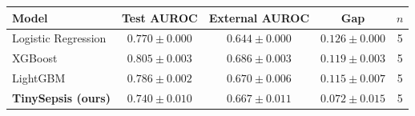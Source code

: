 \begin{tabular}{lcccc}
\toprule
Model & Test AUROC & External AUROC & Gap & $n$ \\
\midrule
Logistic Regression & $0.770 \pm 0.000$ & $0.644 \pm 0.000$ & $0.126 \pm 0.000$ & 5 \\
XGBoost & $0.805 \pm 0.003$ & $0.686 \pm 0.003$ & $0.119 \pm 0.003$ & 5 \\
LightGBM & $0.786 \pm 0.002$ & $0.670 \pm 0.006$ & $0.115 \pm 0.007$ & 5 \\
\textbf{TinySepsis (ours)} & $0.740 \pm 0.010$ & $0.667 \pm 0.011$ & $\mathbf{0.072 \pm 0.015}$ & 5 \\
\bottomrule
\end{tabular}
